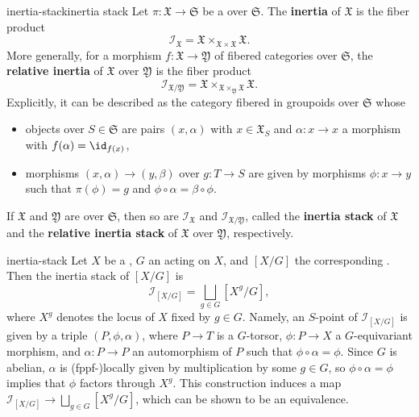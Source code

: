 \begin{topic}{inertia-stack}{inertia stack}
    Let $\pi : \mathfrak{X} \to \mathfrak{S}$ be a  over $\mathfrak{S}$. The \textbf{inertia} of $\mathfrak{X}$ is the fiber product
    \[ \mathcal{I}_\mathfrak{X} = \mathfrak{X} \times_{\mathfrak{X} \times \mathfrak{X}} \mathfrak{X} . \]
    More generally, for a morphism $f : \mathfrak{X} \to \mathfrak{Y}$ of fibered categories over $\mathfrak{S}$, the \textbf{relative inertia} of $\mathfrak{X}$ over $\mathfrak{Y}$ is the fiber product
    \[ \mathcal{I}_{\mathfrak{X}/\mathfrak{Y}} = \mathfrak{X} \times_{\mathfrak{X} \times_\mathfrak{Y} \mathfrak{X}} \mathfrak{X} . \]
    Explicitly, it can be described as the category fibered in groupoids over $\mathfrak{S}$ whose
    \begin{itemize}
        \item objects over $S \in \mathfrak{S}$ are pairs $(x, \alpha)$ with $x \in \mathfrak{X}_S$ and $\alpha : x \to x$ a morphism with $f(\alpha) = \id_{f(x)}$,
        \item morphisms $(x, \alpha) \to (y, \beta)$ over $g : T \to S$ are given by morphisms $\phi : x \to y$ such that $\pi(\phi) = g$ and $\phi \circ \alpha = \beta \circ \phi$.
    \end{itemize}    
    If $\mathfrak{X}$ and $\mathfrak{Y}$ are  over $\mathfrak{S}$, then so are $\mathcal{I}_\mathfrak{X}$ and $\mathcal{I}_{\mathfrak{X}/\mathfrak{Y}}$, called the \textbf{inertia stack} of $\mathfrak{X}$ and the \textbf{relative inertia stack} of $\mathfrak{X}$ over $\mathfrak{Y}$, respectively.
\end{topic}

\begin{example}{inertia-stack}
    Let $X$ be a , $G$ an  acting on $X$, and $[X/G]$ the corresponding . Then the inertia stack of $[X/G]$ is
    \[ \mathcal{I}_{[X/G]} = \bigsqcup_{g \in G} [X^g / G] , \]
    where $X^g$ denotes the locus of $X$ fixed by $g \in G$. Namely, an $S$-point of $\mathcal{I}_{[X/G]}$ is given by a triple $(P, \phi, \alpha)$, where $P \to T$ is a $G$-torsor, $\phi : P \to X$ a $G$-equivariant morphism, and $\alpha : P \to P$ an automorphism of $P$ such that $\phi \circ \alpha = \phi$. Since $G$ is abelian, $\alpha$ is (fppf-)locally given by multiplication by some $g \in G$, so $\phi \circ \alpha = \phi$ implies that $\phi$ factors through $X^g$. This construction induces a map $\mathcal{I}_{[X/G]} \to \bigsqcup_{g \in G} [X^g/G]$, which can be shown to be an equivalence.
\end{example}

